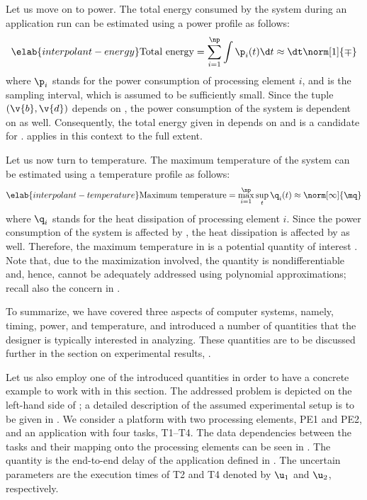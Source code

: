 Let us move on to power. The total energy consumed by the system during an
application run can be estimated using a power profile \mp as follows:
\begin{equation} \elab{interpolant-energy}
  \text{Total energy}
  = \sum_{i = 1}^\np \int \p_i(t) \d t
  \approx \dt \norm[1]{\mp}
\end{equation}
where $\p_i$ stands for the power consumption of processing element $i$, and \dt
is the sampling interval, which is assumed to be sufficiently small. Since the
tuple $(\v{b}, \v{d})$ depends on \vu, the power consumption of the system is
dependent on \vu as well. Consequently, the total energy given in
 depends on \vu and is a candidate for \g.
 applies in this context to the full extent.

Let us now turn to temperature. The maximum temperature of the system can be
estimated using a temperature profile \mq as follows:
\begin{equation} \elab{interpolant-temperature}
  \text{Maximum temperature}
  = \max_{i = 1}^\np \sup_{t} \q_i(t)
  \approx \norm[\infty]{\mq}
\end{equation}
where $\q_i$ stands for the heat dissipation of processing element $i$. Since
the power consumption of the system is affected by \vu, the heat dissipation is
affected by \vu as well. Therefore, the maximum temperature in
 is a potential quantity of interest \g. Note
that, due to the maximization involved, the quantity is nondifferentiable and,
hence, cannot be adequately addressed using polynomial approximations; recall
also the concern in .

To summarize, we have covered three aspects of computer systems, namely, timing,
power, and temperature, and introduced a number of quantities that the designer
is typically interested in analyzing. These quantities are to be discussed
further in the section on experimental results, .

Let us also employ one of the introduced quantities in order to have a concrete
example to work with in this section. The addressed problem is depicted on the
left-hand side of ; a detailed description of the
assumed experimental setup is to be given in . We
consider a platform with two processing elements, PE1 and PE2, and an
application with four tasks, T1--T4. The data dependencies between the tasks and
their mapping onto the processing elements can be seen in
. The quantity \g is the end-to-end delay of the
application defined in . The uncertain parameters \vu
are the execution times of T2 and T4 denoted by $\u_1$ and $\u_2$, respectively.

